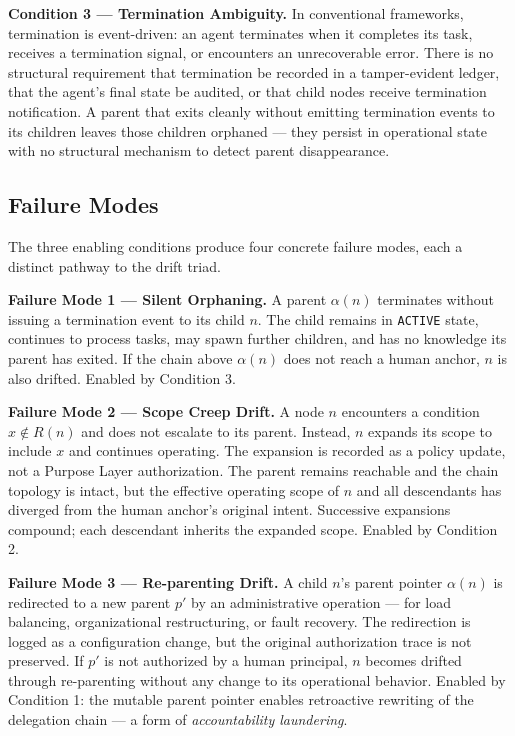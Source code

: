 \medskip
\noindent\textbf{Condition 3 — Termination Ambiguity.}
In conventional frameworks, termination is event-driven: an agent terminates when it completes its task, receives a termination signal, or encounters an unrecoverable error. There is no structural requirement that termination be recorded in a tamper-evident ledger, that the agent's final state be audited, or that child nodes receive termination notification. A parent that exits cleanly without emitting termination events to its children leaves those children orphaned — they persist in operational state with no structural mechanism to detect parent disappearance.

\subsection{Failure Modes}
\label{sec:drift-failure-modes}

The three enabling conditions produce four concrete failure modes, each a distinct pathway to the drift triad.

\medskip
\noindent\textbf{Failure Mode 1 — Silent Orphaning.}
A parent $\alpha(n)$ terminates without issuing a termination event to its child $n$. The child remains in \texttt{ACTIVE} state, continues to process tasks, may spawn further children, and has no knowledge its parent has exited. If the chain above $\alpha(n)$ does not reach a human anchor, $n$ is also drifted. Enabled by Condition 3.

\medskip
\noindent\textbf{Failure Mode 2 — Scope Creep Drift.}
A node $n$ encounters a condition $x \notin R(n)$ and does not escalate to its parent. Instead, $n$ expands its scope to include $x$ and continues operating. The expansion is recorded as a policy update, not a Purpose Layer authorization. The parent remains reachable and the chain topology is intact, but the effective operating scope of $n$ and all descendants has diverged from the human anchor's original intent. Successive expansions compound; each descendant inherits the expanded scope. Enabled by Condition 2.

\medskip
\noindent\textbf{Failure Mode 3 — Re-parenting Drift.}
A child $n$'s parent pointer $\alpha(n)$ is redirected to a new parent $p'$ by an administrative operation — for load balancing, organizational restructuring, or fault recovery. The redirection is logged as a configuration change, but the original authorization trace is not preserved. If $p'$ is not authorized by a human principal, $n$ becomes drifted through re-parenting without any change to its operational behavior. Enabled by Condition 1: the mutable parent pointer enables retroactive rewriting of the delegation chain — a form of \emph{accountability laundering}.

